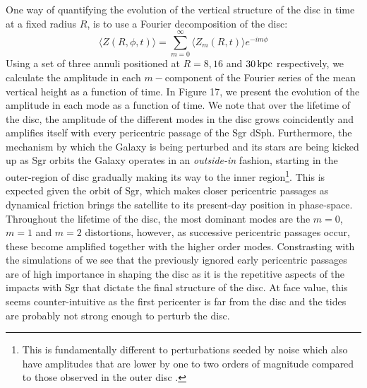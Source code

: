 \documentclass[useAMS,usenatbib]{mnras}
\begin{document}
One way of quantifying the evolution of the vertical structure of the disc in time at a fixed radius $R$, is to use a Fourier decomposition of the disc:
\begin{equation}
\langle Z(R,\phi,t)\rangle= \sum_{m=0}^{\infty}\langle Z_{m}(R,t)\rangle e^{-im\phi}
\end{equation}
Using a set of three annuli positioned at $R=8, 16$ and $30\,\rm{kpc}$ respectively, we calculate the amplitude in each $m-$component of the Fourier series of the mean vertical height as a function of time. In Figure 17, we present the evolution of the amplitude in each mode as a function of time. We note that over the lifetime of the disc, the amplitude of the different modes in the disc grows coincidently and amplifies itself with every pericentric passage of the Sgr dSph. Furthermore, the mechanism by which the Galaxy is being perturbed and its stars are being kicked up as Sgr orbits the Galaxy operates in an {\it outside-in} fashion, starting in the outer-region of disc gradually making its way to the inner region\footnote{This is fundamentally different to perturbations seeded by noise which also have amplitudes that are lower by one to two orders of magnitude compared to those observed in the outer disc \citep{chequers17}.}. This is expected given the orbit of Sgr, which makes closer pericentric passages as dynamical friction brings the satellite to its present-day position in phase-space. Throughout the lifetime of the disc, the most dominant modes are the $m=0$, $m=1$ and $m=2$ distortions, however, as successive pericentric passages occur, these become amplified together with the higher order modes. Constrasting with the simulations of \cite{purcell11,gomez13,price-whelan15} we see that the previously ignored early pericentric passages are of high importance in shaping the disc as it is the repetitive aspects of the impacts with Sgr that dictate the final structure of the disc. At face value, this seems counter-intuitive as the first pericenter is far from the disc and the tides are probably not strong enough to perturb the disc.
\end{document}
